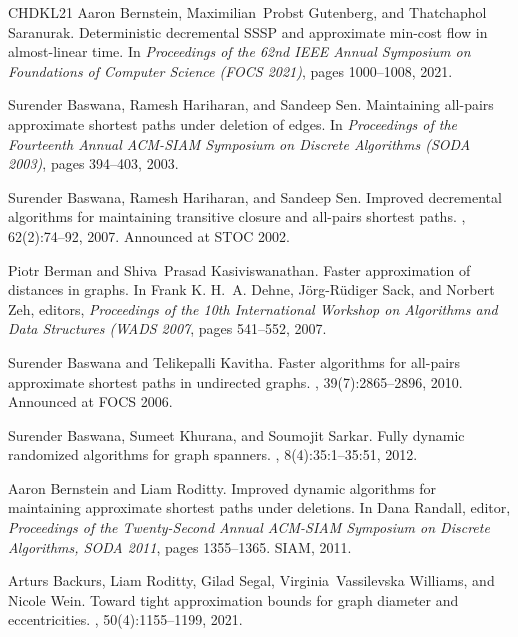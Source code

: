 \documentclass[11pt]{article}
\theoremstyle{definition}
\theoremstyle{remark}
\begin{document}
\begin{titlepage}
\begin{thebibliography}{CHDKL21}
Aaron Bernstein, Maximilian~Probst Gutenberg, and Thatchaphol Saranurak.
\newblock Deterministic decremental {SSSP} and approximate min-cost flow in
  almost-linear time.
\newblock In {\em Proceedings of the 62nd {IEEE} Annual Symposium on
  Foundations of Computer Science ({FOCS} 2021)}, pages 1000--1008, 2021.

Surender Baswana, Ramesh Hariharan, and Sandeep Sen.
\newblock Maintaining all-pairs approximate shortest paths under deletion of
  edges.
\newblock In {\em Proceedings of the Fourteenth Annual {ACM-SIAM} Symposium on
  Discrete Algorithms ({SODA} 2003)}, pages 394--403, 2003.

Surender Baswana, Ramesh Hariharan, and Sandeep Sen.
\newblock Improved decremental algorithms for maintaining transitive closure
  and all-pairs shortest paths.
, 62(2):74--92, 2007.
\newblock Announced at {STOC} 2002.

Piotr Berman and Shiva~Prasad Kasiviswanathan.
\newblock Faster approximation of distances in graphs.
\newblock In Frank K. H.~A. Dehne, J{\"{o}}rg{-}R{\"{u}}diger Sack, and Norbert
  Zeh, editors, {\em Proceedings of the 10th International Workshop on
  Algorithms and Data Structures ({WADS} 2007}, pages 541--552, 2007.

Surender Baswana and Telikepalli Kavitha.
\newblock Faster algorithms for all-pairs approximate shortest paths in
  undirected graphs.
, 39(7):2865--2896, 2010.
\newblock Announced at {FOCS} 2006.

Surender Baswana, Sumeet Khurana, and Soumojit Sarkar.
\newblock Fully dynamic randomized algorithms for graph spanners.
, 8(4):35:1--35:51, 2012.

Aaron Bernstein and Liam Roditty.
\newblock Improved dynamic algorithms for maintaining approximate shortest
  paths under deletions.
\newblock In Dana Randall, editor, {\em Proceedings of the Twenty-Second Annual
  {ACM-SIAM} Symposium on Discrete Algorithms, {SODA} 2011}, pages 1355--1365.
  {SIAM}, 2011.

Arturs Backurs, Liam Roditty, Gilad Segal, Virginia~Vassilevska Williams, and
  Nicole Wein.
\newblock Toward tight approximation bounds for graph diameter and
  eccentricities.
, 50(4):1155--1199, 2021.


\end{thebibliography}
\end{titlepage}
\end{document}
